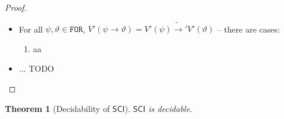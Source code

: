 \documentclass{article}
\newtheorem{theorem}{Theorem}
\theoremstyle{definition}
\theoremstyle{definition}
\theoremstyle{definition}
\theoremstyle{definition}
\theoremstyle{definition}
\newcommand*{\ra}{\rightarrow}
\newcommand*{\FOR}{\texttt{FOR}}
\newcommand{\SCI}{$\mathsf{SCI}$\xspace}
\begin{document}
\begin{proof}
\begin{itemize}
\begin{enumerate}
              \end{enumerate}
        \item For all $\psi, \vartheta \in \FOR$, $V'(\psi \ra \vartheta) = V'(\psi)
                  \tilde{\ra}' V'(\vartheta)$ -- there are cases:
              \begin{enumerate}
                  \item[1°] aa
              \end{enumerate}
        \item ... TODO
    \end{itemize}
\end{proof}

\begin{theorem}[Decidability of \SCI]
    \label{decidability}
    \SCI is decidable.
\end{theorem}
\end{document}
